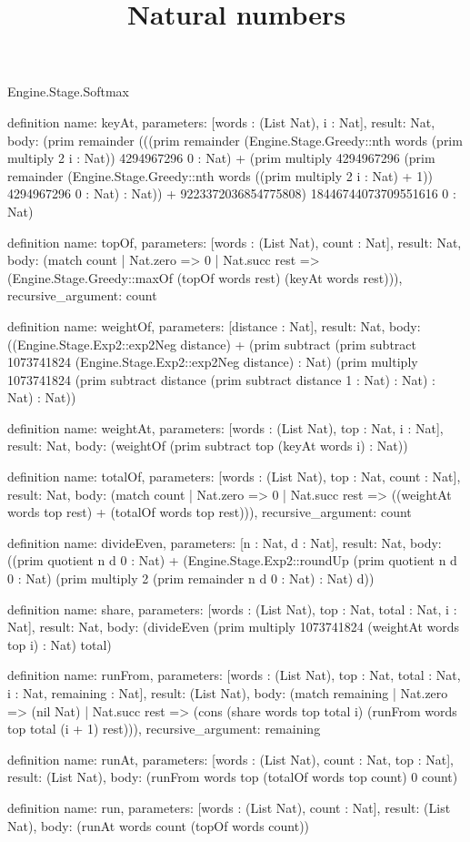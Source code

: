 \begin{lexlean}{Engine.Stage.Softmax}
\title{Natural numbers}
\begin{semanticmodule}
definition{
  name: keyAt,
  parameters: [words : (List Nat), i : Nat],
  result: Nat,
  body: (prim remainder (((prim remainder (Engine.Stage.Greedy::nth words (prim multiply 2 i : Nat)) 4294967296 0 : Nat) + (prim multiply 4294967296 (prim remainder (Engine.Stage.Greedy::nth words ((prim multiply 2 i : Nat) + 1)) 4294967296 0 : Nat) : Nat)) + 9223372036854775808) 18446744073709551616 0 : Nat)
}

definition{
  name: topOf,
  parameters: [words : (List Nat), count : Nat],
  result: Nat,
  body: (match count
    | Nat.zero => 0
    | Nat.succ rest => (Engine.Stage.Greedy::maxOf (topOf words rest) (keyAt words rest))),
  recursive_argument: count
}

definition{
  name: weightOf,
  parameters: [distance : Nat],
  result: Nat,
  body: ((Engine.Stage.Exp2::exp2Neg distance) + (prim subtract (prim subtract 1073741824 (Engine.Stage.Exp2::exp2Neg distance) : Nat) (prim multiply 1073741824 (prim subtract distance (prim subtract distance 1 : Nat) : Nat) : Nat) : Nat))
}

definition{
  name: weightAt,
  parameters: [words : (List Nat), top : Nat, i : Nat],
  result: Nat,
  body: (weightOf (prim subtract top (keyAt words i) : Nat))
}

definition{
  name: totalOf,
  parameters: [words : (List Nat), top : Nat, count : Nat],
  result: Nat,
  body: (match count
    | Nat.zero => 0
    | Nat.succ rest => ((weightAt words top rest) + (totalOf words top rest))),
  recursive_argument: count
}

definition{
  name: divideEven,
  parameters: [n : Nat, d : Nat],
  result: Nat,
  body: ((prim quotient n d 0 : Nat) + (Engine.Stage.Exp2::roundUp (prim quotient n d 0 : Nat) (prim multiply 2 (prim remainder n d 0 : Nat) : Nat) d))
}

definition{
  name: share,
  parameters: [words : (List Nat), top : Nat, total : Nat, i : Nat],
  result: Nat,
  body: (divideEven (prim multiply 1073741824 (weightAt words top i) : Nat) total)
}

definition{
  name: runFrom,
  parameters: [words : (List Nat), top : Nat, total : Nat, i : Nat, remaining : Nat],
  result: (List Nat),
  body: (match remaining
    | Nat.zero => (nil Nat)
    | Nat.succ rest => (cons (share words top total i) (runFrom words top total (i + 1) rest))),
  recursive_argument: remaining
}

definition{
  name: runAt,
  parameters: [words : (List Nat), count : Nat, top : Nat],
  result: (List Nat),
  body: (runFrom words top (totalOf words top count) 0 count)
}

definition{
  name: run,
  parameters: [words : (List Nat), count : Nat],
  result: (List Nat),
  body: (runAt words count (topOf words count))
}
\end{semanticmodule}
\end{lexlean}
